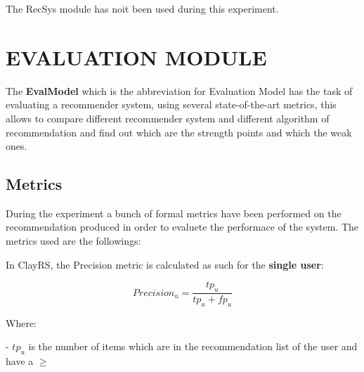 \documentclass[11pt]{article}
\begin{document}


The RecSys module has noit been used during this experiment.





\section{EVALUATION MODULE}\label{sec:eva-module}
The \textbf{EvalModel} which is the abbreviation for Evaluation Model has the task of evaluating a recommender system,
using several state-of-the-art metrics, this allows to compare different recommender system and different algorithm of
recommendation and find out which are the strength points and which the weak ones.

\subsection{Metrics}\label{subsec:metrics}
During the experiment a bunch of formal metrics have been performed on the recommendation produced in order to evaluete the performace
of the system.
The metrics used are the followings:

\hfill\break




In ClayRS, the Precision metric is calculated as such for the \textbf{single user}:

    \[
    Precision_u = \frac{tp_u}{tp_u + fp_u}
    \]

    Where:

    - $tp_u$ is the number of items which are in the recommendation list of the user and have a
       $\geq$ 
        \textbf{}
        \textbf{}
\end{document}
